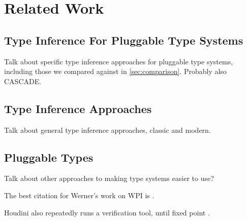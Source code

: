 \section{Related Work}
\label{sec:relatedwork}

\subsection{Type Inference For Pluggable Type Systems}
\label{sec:rw:type-inference-pluggable}

Talk about specific type inference approaches for pluggable type systems, including those we
compared against in \cref{sec:comparison}. Probably also CASCADE.

\subsection{Type Inference Approaches}
\label{sec:rw:type-inference}

Talk about general type inference approaches, classic and modern.

\subsection{Pluggable Types}
\label{sec:pluggable}

Talk about other approaches to making type systems easier to use?


The best citation for Werner's work on WPI is \cite{XiangLD2020}.

Houdini also repeatedly runs a verification tool, until fixed point \cite{FlanaganJL01,FlanaganL2001:Houdini}.
